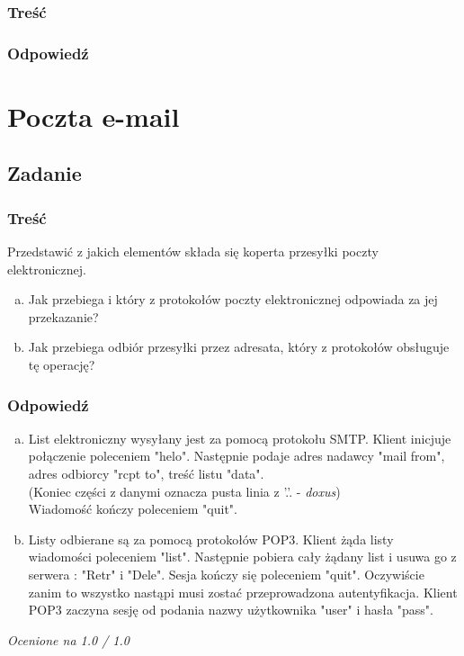 		\subsubsection{Treść}
			
		\subsubsection{Odpowiedź}	
			
	
\section{Poczta e-mail}
	\subsection{Zadanie}
		\subsubsection{Treść}
			Przedstawić z jakich elementów składa się koperta przesyłki poczty elektronicznej.
			\begin{enumerate}[a)]
				\item Jak przebiega i który z protokołów poczty elektronicznej odpowiada za jej przekazanie?
				\item Jak przebiega odbiór przesyłki przez adresata, który z protokołów obsługuje tę operację?
			\end{enumerate}
		\subsubsection{Odpowiedź}
			\begin{enumerate}[a)]
				\item List elektroniczny wysyłany jest za pomocą protokołu SMTP. Klient inicjuje połączenie poleceniem "helo". Następnie podaje adres nadawcy "mail from", adres odbiorcy "rcpt to", treść listu "data". 
				\\(Koniec części z danymi oznacza pusta linia z '.'. - \textit{doxus}) 
				\\Wiadomość kończy poleceniem "quit".
				\item Listy odbierane są za pomocą protokołów POP3. Klient żąda listy wiadomości poleceniem "list". Następnie pobiera cały żądany list i usuwa go z serwera : "Retr" i "Dele". Sesja kończy się poleceniem "quit". Oczywiście zanim to wszystko nastąpi musi zostać przeprowadzona autentyfikacja. Klient POP3 zaczyna sesję od podania nazwy użytkownika "user" i hasła "pass".
			\end{enumerate}
			\small{ \emph{Ocenione na 1.0 / 1.0}}
